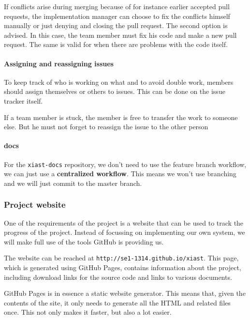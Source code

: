 \documentclass[12pt]{article}
\begin{document}
If conflicts arise during merging because of for instance earlier
accepted pull requests, the implementation manager can choose to fix the
conflicts himself manually or just denying and closing the pull request.
The second option is advised. In this case, the team member must fix his
code and make a new pull request. The same is valid for when there are
problems with the code itself.

\paragraph{Assigning and reassigning
issues}\label{assigning-and-reassigning-issues}

To keep track of who is working on what and to avoid double work,
members should assign themselves or others to issues. This can be done
on the issue tracker itself.

If a team member is stuck, the member is free to transfer the work to
someone else. But he must not forget to reassign the issue to the other
person

\paragraph{docs}\label{docs}

For the \texttt{xiast-docs} repository, we don't need to use the feature
branch workflow, we can just use a \textbf{centralized workflow}. This
means we won't use branching and we will just commit to the master
branch.

\subsubsection{Project website}\label{project-website}

One of the requirements of the project is a website that can be used to
track the progress of the project. Instead of focussing on implementing
our own system, we will make full use of the tools GitHub is providing
us.

The website can be reached at \texttt{http://se1-1314.github.io/xiast}.
This page, which is generated using GitHub Pages, contains information
about the project, including download links for the source code and
links to various documents.

GitHub Pages is in essence a static website generator. This means that,
given the contents of the site, it only needs to generate all the HTML
and related files once. This not only makes it faster, but also a lot
easier.
\end{document}
